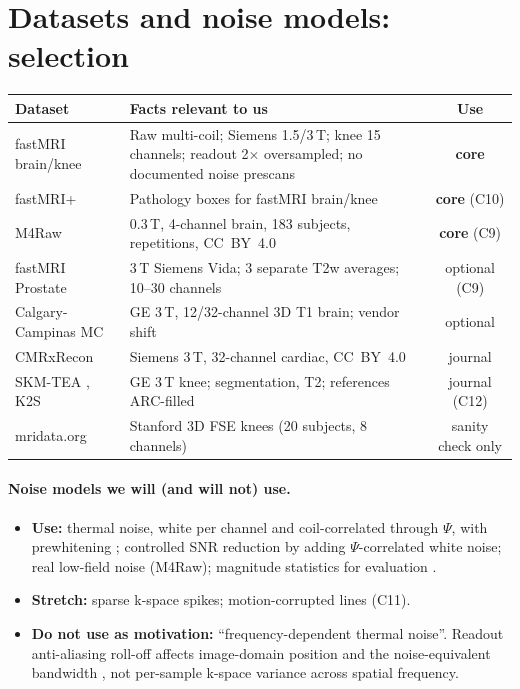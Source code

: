 \documentclass[10pt,a4paper]{article}
\begin{document}
\section{Datasets and noise models: selection}
\label{sec:data}
\begin{center}
\small
\begin{tabularx}{\linewidth}{@{}l L c@{}}
\toprule
Dataset & Facts relevant to us & Use\\
\midrule
fastMRI brain/knee \cite{zbontar2018fastmri,knoll2020fastmri} & Raw multi-coil; Siemens 1.5/3\,T; knee 15 channels; readout 2$\times$ oversampled; no documented noise prescans & \textbf{core}\\
fastMRI+ \cite{zhao2022fastmriplus} & Pathology boxes for fastMRI brain/knee & \textbf{core} (C10)\\
M4Raw \cite{lyu2023m4raw} & 0.3\,T, 4-channel brain, 183 subjects, repetitions, CC~BY~4.0 & \textbf{core} (C9)\\
fastMRI Prostate \cite{tibrewala2024prostate} & 3\,T Siemens Vida; 3 separate T2w averages; 10--30 channels & optional (C9)\\
Calgary-Campinas MC \cite{beauferris2022calgary} & GE 3\,T, 12/32-channel 3D T1 brain; vendor shift & optional\\
CMRxRecon \cite{wang2024cmrxrecon} & Siemens 3\,T, 32-channel cardiac, CC~BY~4.0 & journal\\
SKM-TEA \cite{desai2021skmtea}, K2S \cite{tolpadi2023k2s} & GE 3\,T knee; segmentation, T2; references ARC-filled & journal (C12)\\
mridata.org \cite{ong2018mridata} & Stanford 3D FSE knees (20 subjects, 8 channels) & sanity check only\\
\bottomrule
\end{tabularx}
\end{center}

\paragraph{Noise models we will (and will not) use.}
\begin{itemize}
  \item \textbf{Use:} thermal noise, white per channel and coil-correlated through $\Psi$,
        with prewhitening \cite{roemer1990phased,kellman2005snr}; controlled SNR reduction
        by adding $\Psi$-correlated white noise; real low-field noise (M4Raw); magnitude
        statistics for evaluation \cite{gudbjartsson1995rician,constantinides1997snr}.
  \item \textbf{Stretch:} sparse k-space spikes; motion-corrupted lines (C11).
  \item \textbf{Do not use as motivation:} ``frequency-dependent thermal noise''. Readout
        anti-aliasing roll-off affects image-domain position and the noise-equivalent
        bandwidth \cite{kellman2005snr}, not per-sample k-space variance across spatial
        frequency.
\end{itemize}
\end{document}
